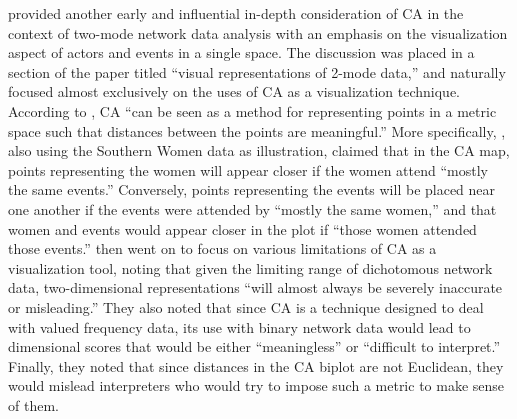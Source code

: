 \documentclass[a4paper,fleqn]{cas-sc}
\begin{document}
\citet{borgatti1997network} provided another early and influential in-depth consideration of CA in the context of two-mode network data analysis with an emphasis on the visualization aspect of actors and events in a single space. The discussion was placed in a section of the paper titled ``visual representations of 2-mode data,'' and naturally focused almost exclusively on the uses of CA as a visualization technique. According to \citet[246]{borgatti1997network}, CA ``can be seen as a method for representing points in a metric space such that distances between the points are meaningful.'' More specifically, \citet{borgatti1997network}, also using the Southern Women data as illustration,  claimed that in the CA map, points representing the women will appear closer if the women attend ``mostly the same events.'' Conversely, points representing the events will be placed near one another if the events were attended by ``mostly the same women,'' and that women and events would appear closer in the plot if ``those women attended those events.'' \citet[247-249]{borgatti1997network} then went on to focus on various limitations of CA as a visualization tool, noting that given the limiting range of dichotomous network data, two-dimensional representations ``will almost always be severely inaccurate or misleading.'' They also noted that since CA is a technique designed to deal with valued frequency data, its use with binary network data would lead to dimensional scores that would be either ``meaningless'' or ``difficult to interpret.'' Finally, they noted that since distances in the CA biplot are not Euclidean, they would mislead interpreters who would try to impose such a metric to make sense of them. 
\end{document}
